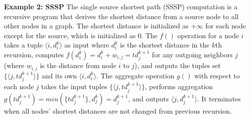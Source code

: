 \textbf{Example 2: SSSP} The single source shortest path (SSSP) computation is a recursive program that derives the shortest distance from a source node to all other nodes in a graph. The shortest distance is initialized as $+\infty$ for each node except for the source, which is initialized as 0. The $f()$ operation for a node $i$ takes a tuple $\langle i,d_i^k\rangle$ as input where $d_i^k$ is the shortest distance in the $k$th recursion, computes $f(d_i^k)=d_i^k+w_{i,j}=td_j^{k+1}$ for any outgoing neighbors $j$ (where $w_{i,j}$ is the distance from node $i$ to $j$), and outputs the tuples set $\{\langle j,td_j^{k+1}\rangle\}$ and its own $\langle i,d_i^k\rangle$. The aggregate operation $g()$ with respect to each node $j$ takes the input tuples $\{\langle j,td_j^{k+1}\rangle\}$, performs aggregation $g(td_j^{k+1})=min(\{td_j^{k+1}\},d_j^k)=d_j^{k+1}$, and outputs $\langle j,d_j^{k+1}\rangle$. It terminates when all nodes' shortest distances are not changed from previous recursion.

